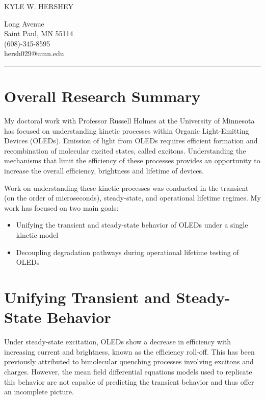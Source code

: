 \documentclass[a4paper,titlepage]{article}
\begin{document}
\Huge \noindent KYLE W.
 HERSHEY \hfill 
\footnotesize \parbox[b]{2in}{\begingroup {} Long Avenue\\Saint Paul, MN 55114\\(608)-345-8595\\hersh029@umn.edu \par \endgroup}
\normalsize
\vspace{1ex}
\hrule

\section*{Overall Research Summary}
My doctoral work with Professor Russell Holmes at the University of Minnesota has focused on understanding kinetic processes within Organic Light-Emitting Devices (OLEDs).
Emission of light from OLEDs requires efficient formation and recombination of molecular excited states, called excitons.
Understanding the mechanisms that limit the efficiency of these processes provides an opportunity to increase the overall efficiency, brightness and lifetime of devices.


Work on understanding these kinetic processes was conducted in the transient  (on the order of microseconds), steady-state, and operational lifetime regimes.
My work has focused on two main goals:

\begin{itemize}
\vspace{-1.5ex}
\item Unifying the transient and steady-state behavior of OLEDs under a single kinetic model
\vspace{-1.5ex}
\item Decoupling degradation pathways during operational lifetime testing of OLEDs
\end{itemize}


\vspace{-2ex}
\section*{Unifying Transient and Steady-State Behavior}

Under steady-state excitation, OLEDs show a decrease in efficiency with increasing current and brightness, known as the efficiency roll-off.
This has been previously attributed to bimolecular quenching processes involving excitons and charges.
However, the mean field differential equations models used to replicate this behavior are not capable of predicting the transient behavior and thus offer an incomplete picture.
  
\end{document}

